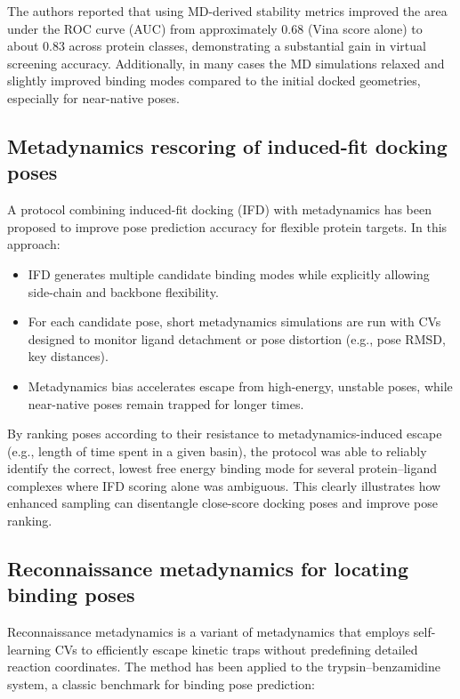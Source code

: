 \documentclass[12pt]{article}
\begin{document}
The authors reported that using MD-derived stability metrics improved the area under the ROC curve (AUC) from approximately 0.68 (Vina score alone) to about 0.83 across protein classes, demonstrating a substantial gain in virtual screening accuracy.\cite{CH9_guterres2020} Additionally, in many cases the MD simulations relaxed and slightly improved binding modes compared to the initial docked geometries, especially for near-native poses.

\subsection{Metadynamics rescoring of induced-fit docking poses}

A protocol combining induced-fit docking (IFD) with metadynamics has been proposed to improve pose prediction accuracy for flexible protein targets.\cite{CH9_clark2016} In this approach:

\begin{itemize}
\item IFD generates multiple candidate binding modes while explicitly allowing side-chain and backbone flexibility.
\item For each candidate pose, short metadynamics simulations are run with CVs designed to monitor ligand detachment or pose distortion (e.g., pose RMSD, key distances).
\item Metadynamics bias accelerates escape from high-energy, unstable poses, while near-native poses remain trapped for longer times.
\end{itemize}

By ranking poses according to their resistance to metadynamics-induced escape (e.g., length of time spent in a given basin), the protocol was able to reliably identify the correct, lowest free energy binding mode for several protein--ligand complexes where IFD scoring alone was ambiguous.\cite{CH9_clark2016} This clearly illustrates how enhanced sampling can disentangle close-score docking poses and improve pose ranking.

\subsection{Reconnaissance metadynamics for locating binding poses}

Reconnaissance metadynamics is a variant of metadynamics that employs self-learning CVs to efficiently escape kinetic traps without predefining detailed reaction coordinates.\cite{CH9_soderhjelm2012} The method has been applied to the trypsin--benzamidine system, a classic benchmark for binding pose prediction:
\end{document}
